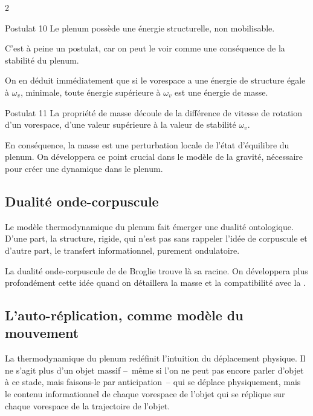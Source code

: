 \begin{multicols}{2}
\begin{mybox}[breakable,colback=blue!10, colbacktitle=pkcolor]{Postulat 10}
Le plenum possède une énergie structurelle, non mobilisable. 
\end{mybox}
\medskip

C'est à peine un postulat, car on peut le voir comme une conséquence
de la stabilité du plenum.

On en déduit immédiatement que si le vorespace a une énergie de
structure égale à $\omega_v$, minimale, toute énergie supérieure à $\omega_v$ est
une énergie de masse.

\begin{mybox}[breakable,colback=blue!10, colbacktitle=pkcolor]{Postulat 11}
La propriété de masse découle de la différence de vitesse de rotation
d'un vorespace, d'une valeur supérieure à la valeur de stabilité
$\omega_v$.
\end{mybox}
\medskip

En conséquence, la masse est une perturbation locale de l'état
d'équilibre du plenum. On développera ce point crucial dans le modèle
de la gravité, nécessaire pour créer une dynamique dans le plenum.

\subsection{Dualité onde-corpuscule}

Le modèle thermodynamique du plenum fait émerger une dualité
ontologique. D'une part, la structure, rigide, qui n'est pas sans
rappeler l'idée de corpuscule et d'autre part, le transfert
informationnel, purement ondulatoire.

La dualité onde-corpuscule de de Broglie trouve là sa racine. On
développera plus profondément cette idée quand on détaillera la masse et la compatibilité avec la \MQ.

\subsection{L'auto-réplication, comme modèle du mouvement}

La thermodynamique du plenum redéfinit l'intuition du déplacement
physique. Il ne s'agit plus d'un objet massif --~même si l'on ne peut
pas encore parler d'objet à ce stade, mais faisons-le par anticipation~--
 qui se déplace physiquement, mais le contenu informationnel de
chaque vorespace de l'objet qui se réplique sur chaque vorespace de la
trajectoire de l'objet.


\end{multicols}
